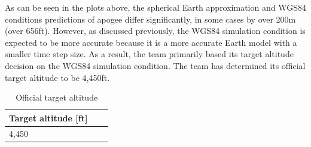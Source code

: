 \FloatBarrier
As can be seen in the plots above, the spherical Earth approximation and WGS84 conditions predictions of apogee differ significantly, in some cases by over 200m (over 656ft). However, as discussed previously, the WGS84 simulation condition is expected to be more accurate because it is a more accurate Earth model with a smaller time step size. As a result, the team primarily based its target altitude decision on the WGS84 simulation condition. The team has determined its official target altitude to be 4,450ft.
\begin{table}[H]
\centering
\caption{Official target altitude}
\label{tab:FlightDynamics:TargetAltitude}
\begin{tabularx}{.5\linewidth}{XlX}
\toprule
  \textbf{Target altitude [ft]}\\
\midrule
4,450 \\
\bottomrule
\end{tabularx}
\end{table}

